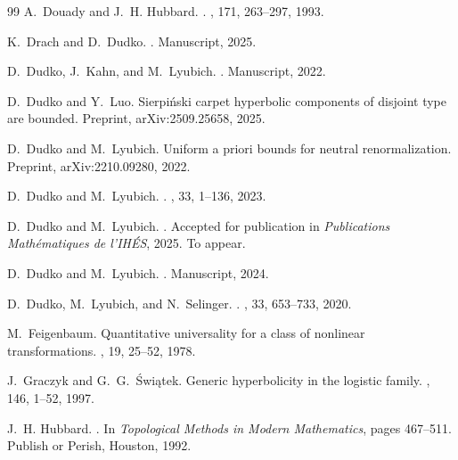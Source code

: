 \documentclass[twoside,leqno]{article}
\theoremstyle{plain}
\begin{document}
\begin{thebibliography}{99}
A.~Douady and J.~H. Hubbard.
.
, 171, 263--297, 1993.

K.~Drach and D.~Dudko.
.
\newblock Manuscript, 2025.


D.~Dudko, J.~Kahn, and M.~Lyubich.
.
\newblock Manuscript, 2022.

D.~Dudko and Y.~Luo.
\newblock Sierpi{\'n}ski carpet hyperbolic components of disjoint type are bounded.
\newblock Preprint, arXiv:2509.25658, 2025.

D.~Dudko and M.~Lyubich.
\newblock Uniform a priori bounds for neutral renormalization.
\newblock Preprint, arXiv:2210.09280, 2022.

D.~Dudko and M.~Lyubich.
.
, 33, 1--136, 2023.


D.~Dudko and M.~Lyubich.
.
\newblock Accepted for publication in {\em Publications Mathématiques de l'IHÉS}, 2025. To appear.

D.~Dudko and M.~Lyubich.
.
\newblock Manuscript, 2024.

D.~Dudko, M.~Lyubich, and N.~Selinger.
.
, 33, 653--733, 2020.

M.~Feigenbaum.
\newblock Quantitative universality for a class of nonlinear transformations.
, 19, 25--52, 1978.

J.~Graczyk and G.~G.~{\'{S}}wi\k{a}tek.
\newblock Generic hyperbolicity in the logistic family.
, 146, 1--52, 1997.

J.~H. Hubbard.
.
\newblock In {\em Topological Methods in Modern Mathematics}, pages 467--511. Publish or Perish, Houston, 1992.


\end{thebibliography}
\end{document}
